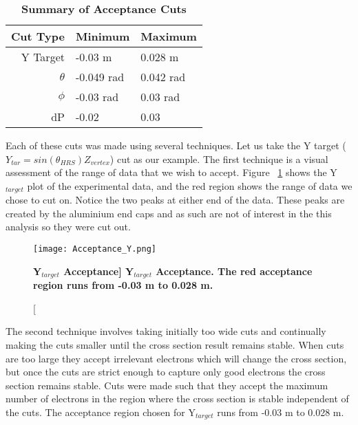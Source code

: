 \begin{table}[!h]
\centering
\begin{tabular}{|r | l l|}
\hline
\textbf{Cut Type} & \textbf{Minimum} & \textbf{Maximum}\\
\hline
Y Target & -0.03 m & 0.028 m\\ 
$\theta$ & -0.049 rad & 0.042 rad\\ 
$\phi$ & -0.03 rad & 0.03 rad\\ 
dP & -0.02 & 0.03\\ 
\hline
\end{tabular}
\caption{{\bf{Summary of Acceptance Cuts}} }
\label{tab:cuts}
\end{table}

Each of these cuts was made using several techniques. Let us take the Y target ($Y_{tar}=sin\left(\theta_{HRS}\right)Z_{vertex}$) cut as our example. The first technique is a visual assessment of the range of data that we wish to accept. Figure ~\ref{fig:acceptance_y} shows the Y$_{target}$ plot of the experimental data, and the red region shows the range of data we chose to cut on. Notice the two peaks at either end of the data. These peaks are created by the aluminium end caps and as such are not of interest in the this analysis so they were cut out. 

\begin{figure}[!ht]
\begin{center}
\texttt{[image: Acceptance\_Y.png]}
\end{center}
\caption[\bf{Y$_{target}$ Acceptance}]{
{\bf{Y$_{target}$ Acceptance.}} The red acceptance region runs from -0.03 m to 0.028 m.}
\label{fig:acceptance_y}
\end{figure}

The second technique involves taking initially too wide cuts and continually making the cuts smaller until the cross section result remains stable. When cuts are too large they accept irrelevant electrons which will change the cross section, but once the cuts are strict enough to capture only good electrons the cross section remains stable. Cuts were made such that they accept the maximum number of electrons in the region where the cross section is stable independent of the cuts. The acceptance region chosen for Y$_{target}$ runs from -0.03 m to 0.028 m.

